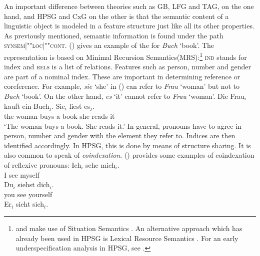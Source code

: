 An important difference between theories such as GB, LFG and TAG, on the one hand, and HPSG and CxG on the other is that the semantic content of a linguistic
object is modeled in a feature structure just like all its other properties. As previously mentioned, semantic information is found under the path
\textsc{synsem|""loc|""cont}. () gives an example of the \contv for \emph{Buch} `book'. The
representation is based on Minimal Recursion Semantics\indexmrs (MRS):\footnote{
   \citet{ps2} and \citet{GSag2000a-u} make use of Situation Semantics  \citep*{BP83a,CMP90,Devlin92}\nocite{BP87a}.
   An alternative approach which has already been used in HPSG is Lexical Resource Semantics \citep{RS2004a-u}.
   For an early underspecification analysis in HPSG, see .
}
\ea
\label{le-buch}
\z
\textsc{ind} stands for index and \textsc{rels} is a list of relations. Features such as person, number and
gender are part of a nominal index. These are important
in determining reference or coreference.
For example, \emph{sie} `she' in () can refer to \emph{Frau} `woman' but not to \emph{Buch} `book'. On the other hand, \emph{es} 
`it' cannot refer to \emph{Frau} `woman'.
\ea
\gll Die Frau$_i$ kauft ein Buch$_j$. Sie$_i$ liest es$_j$.\\
	 the woman buys a book she reads it\\
\glt `The woman buys a book. She reads it.'
\z
In general, pronouns have to agree in person, number and gender with the element they refer to. Indices are then identified accordingly.
In HPSG, this is done by means of structure sharing. It is also common to speak of \textit{coindexation}.
() provides some examples of coindexation of reflexive pronouns:
\eal
\ex
\gll Ich$_i$ sehe mich$_i$.\\
     I see myself\\
\ex 
\gll Du$_i$ siehst dich$_i$.\\
     you see yourself\\
\ex 
\gll Er$_i$ sieht sich$_i$.\\
